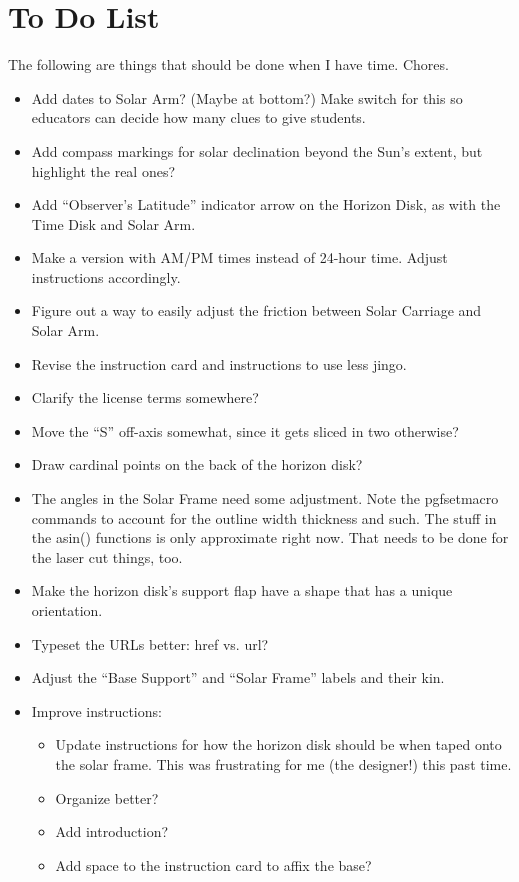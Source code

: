 \documentclass[tikz]{article}
\newif\ifPrintInstructions  %
\newif\ifPrintWishlist  %
\begin{document}
\fi %








\ifPrintWishlist
	\newpage
	
	\section*{To Do List}
	The following are things that should be done when I have time. Chores. 
	\begin{itemize}
		\item Add dates to Solar Arm? (Maybe at bottom?) Make switch for this so educators can decide how many clues to give students.
		\item Add compass markings for solar declination beyond the Sun's extent, but highlight the real ones?
		\item Add ``Observer's Latitude'' indicator arrow on the Horizon Disk, as with the Time Disk and Solar Arm. 
		\item Make a version with AM/PM times instead of 24-hour time. Adjust instructions accordingly. 
		\item Figure out a way to easily adjust the friction between Solar Carriage and Solar Arm. 
		\item Revise the instruction card and instructions to use less jingo. 
		\item Clarify the license terms somewhere?
		\item Move the ``S'' off-axis somewhat, since it gets sliced in two otherwise?
		\item Draw cardinal points on the back of the horizon disk? 
		\item The angles in the Solar Frame need some adjustment. Note the pgfsetmacro commands to account for the outline width thickness and such. The stuff in the asin() functions is only approximate right now. That needs to be done for the laser cut things, too. 
		\item Make the horizon disk's support flap have a shape that has a unique orientation. 
		\item Typeset the URLs better: href vs. url?
		\item Adjust the ``Base Support'' and ``Solar Frame'' labels and their kin. 
		\item Improve instructions:
		\begin{itemize}
			\item Update instructions for how the horizon disk should be when taped onto the solar frame. This was frustrating for me (the designer!) this past time. 
			\item Organize better? 
			\item Add introduction? 
			\item Add space to the instruction card to affix the base?
		\end{itemize}
	\end{itemize}
\end{document}
